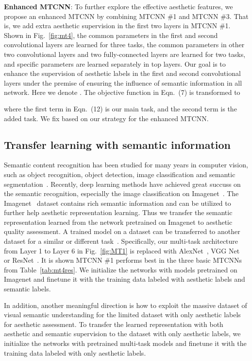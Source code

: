\documentclass[journal]{IEEEtran}
\begin{document}
\textbf{Enhanced MTCNN}: To further explore the effective aesthetic features, we propose an enhanced MTCNN by combining MTCNN \#1 and MTCNN \#3. That is, we add extra aesthetic supervision in the first two layers in MTCNN \#1. Shown in Fig.~\ref{fig:mt4}, the common parameters  in the first and second convolutional layers are learned for three tasks, the common parameters  in other two convolutional layers and two fully-connected layers are learned for two tasks, and specific parameters  are learned separately in top layers. Our goal is to enhance the supervision of aesthetic labels in the first and second convolutional layers under the premise of ensuring the influence of semantic information in all network. Here we denote . The objective function in Eqn.~(7) is transformed to

where the first term in Eqn.~(12) is our main task, and the second term is the added task. We fix  based on our strategy for the enhanced MTCNN.

\subsection{Transfer learning with semantic information}
Semantic content recognition has been studied for many years in computer vision, such as object recognition, object detection, image classification and semantic segmentation~\cite{Girshick_2015_ICCV,Krizhevsky12,long2015fully,Simonyan14c,He2015}. Recently, deep learning methods have achieved great succuss on the semantic recognition, especially the image classification on Imagenet~\cite{ Krizhevsky12,Simonyan14c,He2015,deng2009imagenet}. The Imagenet~\cite{deng2009imagenet} dataset contains rich semantic information and can be utilized to further help aesthetic representation learning. Thus we transfer the semantic representation learned from the network pretrained on Imagenet to aesthetic quality assessment. A trained model on a dataset can be transferred to another dataset for a similar or different task~\cite{pan2010survey,donahue2013decaf}. Specifically, our multi-task architecture from Layer 1 to Layer 6 in Fig.~\ref{fig:MT1} is replaced with AlexNet~\cite{Krizhevsky12}, VGG Net~\cite{Simonyan14c} or ResNet~\cite{He2015}. It is shown MTCNN \#1 performs best in the three basic MTCNNs from Table~\ref{tab:mt4res}. We initialize the networks with models pretrained on Imagenet and finetune it with the training data labeled with aesthetic labels and semantic labels.

In addition, another meaningful direction is how to exploit the massive dataset of visual semantic understanding for the limited dataset with only aesthetic labels for aesthetic assessment. To transfer the learned representation with both aesthetic and semantic supervision to the dataset with only aesthetic labels, we initialize the networks with pretrained multi-task models and finetune it with the training data labeled with only aesthetic labels.
\end{document}
